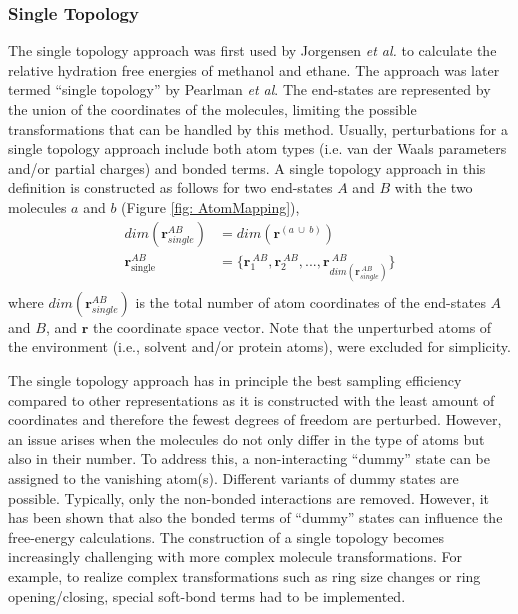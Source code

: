 \subsubsection{Single Topology}
The single topology approach was first used by Jorgensen \textit{et al.}\cite{Jorgensen1985} to calculate the relative hydration free energies of methanol and ethane. The approach was later termed ``single topology'' by Pearlman \textit{et al}.\cite{Pearlman1991}
The end-states are represented by the union of the coordinates of the molecules, limiting the possible transformations that can be handled by this method. Usually, perturbations for a single topology approach include both atom types (i.e. van der Waals parameters and/or partial charges) and bonded terms.\cite{Jorgensen1985, Pearlman1991, Pearlman1994, Boresch1999, Boresch1999B, Donnini2011, Donnini2016, Wang2015,  Liu2015, Wang2017, Damodaran2001}
%
A single topology approach in this definition is constructed as follows for two end-states $A$ and $B$ with the two molecules $a$ and $b$ (Figure \ref{fig: AtomMapping}),
\begin{align*}
dim(\textbf{r}_{single}^{AB}) &= dim(\textbf{r}^{(a~\cup~b)}) \\
    \textbf{r}^{AB}_{\text{single}} &= \{\textbf{r}^{~AB}_{1}, \textbf{r}^{~AB}_{2}, ..., \textbf{r}^{~AB}_{dim(\textbf{r}_{single}^{~AB})}\}\\
\end{align*}
where $dim(\textbf{r}_{single}^{AB})$ is the total number of atom coordinates of the end-states $A$ and $B$, and $\textbf{r}$ the coordinate space vector. Note that the unperturbed atoms of the environment (i.e., solvent and/or protein atoms), were excluded for simplicity.

The single topology approach has in principle the best sampling efficiency compared to other representations as it is constructed with the least amount of coordinates and therefore the fewest degrees of freedom are perturbed.\cite{Pearlman1994, Donnini2011, Yu2017, Fleck2021}
However, an issue arises when the molecules do not only differ in the type of atoms but also in their number. To address this, a non-interacting ``dummy'' state can be assigned to the vanishing atom(s).\cite{Pearlman1994, Donnini2011, Yu2017, Fleck2021}
Different variants of dummy states are possible. Typically, only the non-bonded interactions are removed. However, it has been shown that also the bonded terms of ``dummy'' states can influence the free-energy calculations.\cite{Fleck2021}
The construction of a single topology becomes increasingly challenging with more complex molecule transformations.
For example, to realize complex transformations such as ring size changes or ring opening/closing, special soft-bond terms had to be implemented.\cite{Wang2017} 

